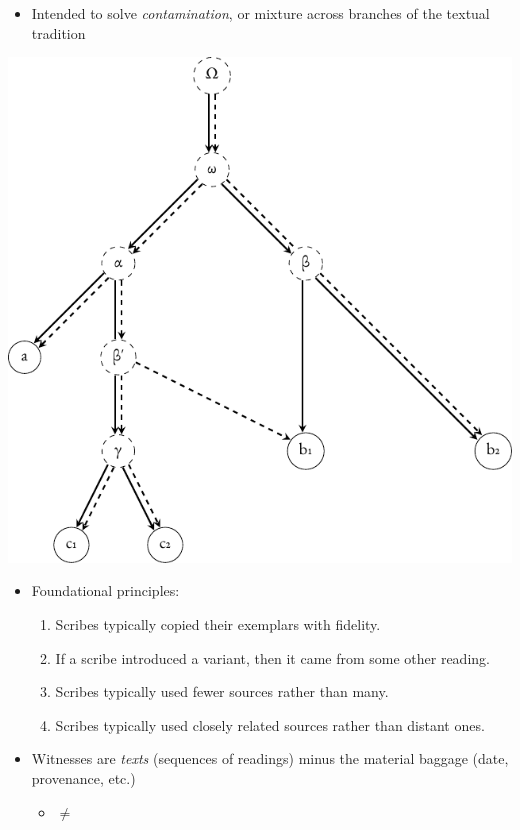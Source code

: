 \documentclass[10pt]{beamer}
\begin{document}
	\begin{frame}
		\begin{itemize}
			\item Intended to solve \emph{contamination}, or mixture across branches of the textual tradition
		\end{itemize}
		\begin{center}
			\includegraphics[scale=0.5]{../img/stemma-rooted-contamination.pdf}
		\end{center}
	\end{frame}
	\begin{frame}
		\begin{itemize}
			\item Foundational principles:
			\begin{enumerate}
				\item Scribes typically copied their exemplars with fidelity.
				\item If a scribe introduced a variant, then it came from some other reading.
				\item Scribes typically used fewer sources rather than many.
				\item Scribes typically used closely related sources rather than distant ones.
			\end{enumerate}
			\item Witnesses are \emph{texts} (sequences of readings) minus the material baggage (date, provenance, etc.)
			\begin{itemize}
				\item {} $\neq$ 
			\end{itemize}
		\end{itemize}
	\end{frame}
\end{document}
